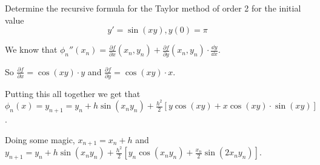 \documentclass[../diffeq.tex]{subfiles}
\begin{document}
\begin{example}
    Determine the recursive formula for the Taylor method of order 2 for the initial value 
    \[ y'=\sin(xy), y(0)=\pi \]

    We know that $\phi_n''(x_n)=\frac{\partial f}{\partial x}(x_n,y_n)+\frac{\partial f}{\partial y}(x_n,y_n)\cdot \frac{\dd y}{\dd x}$.

    So $\frac{\partial f}{\partial x}=\cos(xy)\cdot y$ and $\frac{\partial f}{\partial y}=\cos(xy)\cdot x$. 

    Putting this all together we get that $\phi_n(x)=y_{n+1}=y_n+h\sin(x_ny_n)+\frac{h^2}{2}[y\cos(xy)+x\cos(xy)\cdot \sin(xy)]$.

    Doing some magic, $x_{n+1}=x_n+h$ and $y_{n+1}=y_n+h\sin(x_ny_n)+\frac{h^2}{2}[y_n\cos(x_ny_n)+\frac{x_n}{2}\sin(2x_ny_n)]$. 
\end{example}
\end{document}
